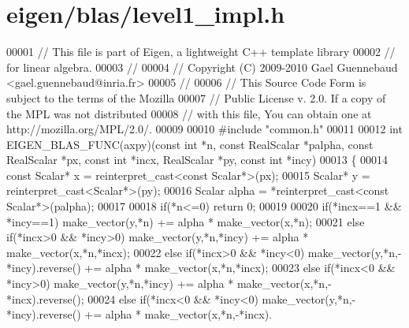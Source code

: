 \hypertarget{eigen_2blas_2level1__impl_8h_source}{}\section{eigen/blas/level1\+\_\+impl.h}
\label{eigen_2blas_2level1__impl_8h_source}

\begin{DoxyCode}
00001 \textcolor{comment}{// This file is part of Eigen, a lightweight C++ template library}
00002 \textcolor{comment}{// for linear algebra.}
00003 \textcolor{comment}{//}
00004 \textcolor{comment}{// Copyright (C) 2009-2010 Gael Guennebaud <gael.guennebaud@inria.fr>}
00005 \textcolor{comment}{//}
00006 \textcolor{comment}{// This Source Code Form is subject to the terms of the Mozilla}
00007 \textcolor{comment}{// Public License v. 2.0. If a copy of the MPL was not distributed}
00008 \textcolor{comment}{// with this file, You can obtain one at http://mozilla.org/MPL/2.0/.}
00009 
00010 \textcolor{preprocessor}{#include "common.h"}
00011 
00012 \textcolor{keywordtype}{int} EIGEN\_BLAS\_FUNC(axpy)(\textcolor{keyword}{const} \textcolor{keywordtype}{int} *n, \textcolor{keyword}{const} RealScalar *palpha, \textcolor{keyword}{const} RealScalar *px, \textcolor{keyword}{const} \textcolor{keywordtype}{int} *incx, 
      RealScalar *py, \textcolor{keyword}{const} \textcolor{keywordtype}{int} *incy)
00013 \{
00014   \textcolor{keyword}{const} Scalar* x = \textcolor{keyword}{reinterpret\_cast<}\textcolor{keyword}{const }Scalar*\textcolor{keyword}{>}(px);
00015   Scalar* y = \textcolor{keyword}{reinterpret\_cast<}Scalar*\textcolor{keyword}{>}(py);
00016   Scalar alpha  = *\textcolor{keyword}{reinterpret\_cast<}\textcolor{keyword}{const }Scalar*\textcolor{keyword}{>}(palpha);
00017 
00018   \textcolor{keywordflow}{if}(*n<=0) \textcolor{keywordflow}{return} 0;
00019 
00020   \textcolor{keywordflow}{if}(*incx==1 && *incy==1)    make\_vector(y,*n) += alpha * make\_vector(x,*n);
00021   \textcolor{keywordflow}{else} \textcolor{keywordflow}{if}(*incx>0 && *incy>0) make\_vector(y,*n,*incy) += alpha * make\_vector(x,*n,*incx);
00022   \textcolor{keywordflow}{else} \textcolor{keywordflow}{if}(*incx>0 && *incy<0) make\_vector(y,*n,-*incy).reverse() += alpha * make\_vector(x,*n,*incx);
00023   \textcolor{keywordflow}{else} \textcolor{keywordflow}{if}(*incx<0 && *incy>0) make\_vector(y,*n,*incy) += alpha * make\_vector(x,*n,-*incx).reverse();
00024   \textcolor{keywordflow}{else} \textcolor{keywordflow}{if}(*incx<0 && *incy<0) make\_vector(y,*n,-*incy).reverse() += alpha * make\_vector(x,*n,-*incx).

\end{DoxyCode}
